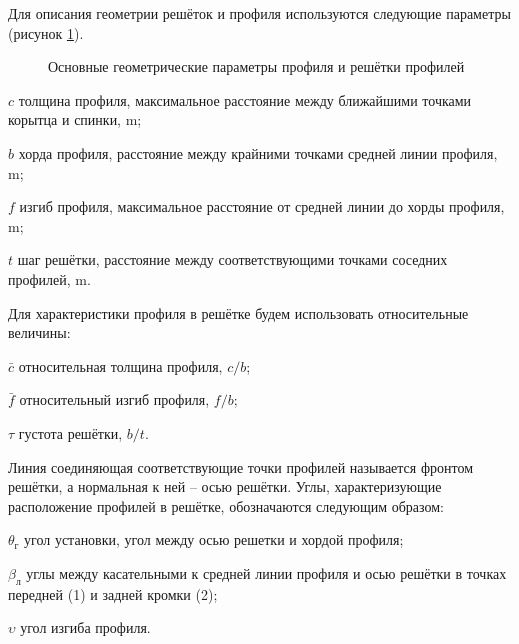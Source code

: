 Для описания геометрии решёток и профиля используются следующие параметры (рисунок \ref{fig:cascad}).  
\begin{figure} [ht]
	\caption{Основные геометрические параметры профиля и решётки профилей} 
	\label{fig:cascad}
\end{figure}
\eqexplSetIntro{}
\begin{eqexpl}
\item{\(c\)}  толщина профиля, максимальное расстояние между ближайшими точками корытца и спинки, \(\si\meter\); 
\item{\(b\)} хорда профиля, расстояние между крайними точками средней линии профиля, \(\si\meter\); 
\item{\(f\)} изгиб профиля, максимальное расстояние от средней линии до хорды профиля, \(\si\meter\);
\item{\(t\)} шаг решётки, расстояние между соответствующими точками соседних профилей, \(\si\meter\).
\end{eqexpl}

Для характеристики профиля в решётке будем использовать относительные величины: 
\begin{eqexpl}
\item{\(\bar{c}\)} относительная толщина профиля, \(c/b\); 
\item{\(\bar{f}\)} относительный изгиб профиля, \(f/b\);
\item{\(\tau\)} густота решётки, \(b/t\).
\end{eqexpl}

Линия соединяющая соответствующие точки профилей называется фронтом решётки, а нормальная к ней – осью решётки. Углы, характеризующие расположение профилей в решётке, обозначаются следующим образом:
\begin{eqexpl}
\item{\(\theta_{\text{г}}\)} угол установки, угол между осью решетки и хордой профиля; 
\item{\(\beta_\text{л}\)} углы между касательными к средней линии профиля и осью решётки в точках передней (1) и задней кромки (2);
\item{\(\upsilon\)} угол изгиба профиля.
\end{eqexpl}

